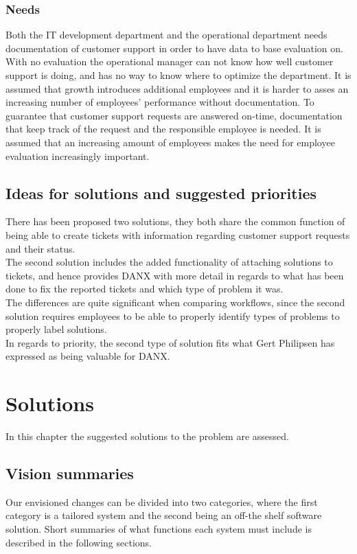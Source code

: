 \subsubsection{Needs}
Both the IT development department and the operational department needs documentation of customer support in order to have data to base evaluation on. With no evaluation the operational manager can not know how well customer support is doing, and has no way to know where to optimize the department.
It is assumed that growth introduces additional employees and it is harder to asses an increasing number of employees’ performance without documentation. To guarantee that customer support requests are answered on-time, documentation that keep track of the request and the responsible employee is needed. It is assumed that an increasing amount of employees makes the need for employee evaluation increasingly important.

\subsection{Ideas for solutions and suggested priorities}
There has been proposed two solutions, they both share the common function of being able to create tickets with information regarding customer support requests and their status.\\
The second solution includes the added functionality of attaching solutions to tickets, and hence provides DANX with more detail in regards to what has been done to fix the reported tickets and which type of problem it was.\\
The differences are quite significant when comparing workflows, since the second solution requires employees to be able to properly identify types of problems to properly label solutions.\\
In regards to priority, the second type of solution fits what Gert Philipsen has expressed as being valuable for DANX.\cite{gert003}

\section{Solutions}
In this chapter the suggested solutions to the problem are assessed.

\subsection{Vision summaries}
Our envisioned changes can be divided into two categories, where the first category is a tailored system and the second being an off-the shelf software solution.
Short summaries of what functions each system must include is described in the following sections.

